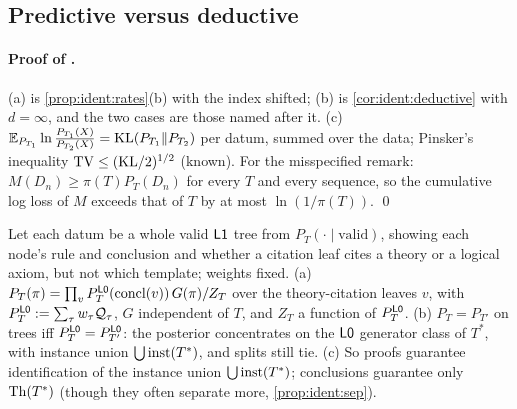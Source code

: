 \subsection{Predictive versus deductive}\label{app:ident:pred}

\paragraph{Proof of .} (a) is \cref{prop:ident:rates}(b) with the index shifted; (b) is \cref{cor:ident:deductive} with $d=\infty$, and the two cases are those named after it. (c) $\mathbb{E}_{P_{T_1}}\ln\frac{P_{T_1}(X)}{P_{T_2}(X)}=\mathrm{KL}(P_{T_1}\|P_{T_2})$ per datum, summed over the data; Pinsker's inequality $\mathrm{TV}\le(\mathrm{KL}/2)^{1/2}$ (known). For the misspecified remark: $M(D_n)\ge\pi(T)P_T(D_n)$ for every $T$ and every sequence, so the cumulative log loss of $M$ exceeds that of $T$ by at most $\ln(1/\pi(T))$. \qed

\begin{proposition}\label{prop:ident:proofs}
Let each datum be a whole valid $\mathord{\mathsf{L1}}$ tree from $P_T(\cdot\mid\text{valid})$, showing each node's rule and conclusion and whether a citation leaf cites a theory or a logical axiom, but not which template; weights fixed. (a) $P_T(\pi)=\prod_vP^{\mathord{\mathsf{L0}}}_T(\mathrm{concl}(v))\,G(\pi)/Z_T$ over the theory-citation leaves $v$, with $P^{\mathord{\mathsf{L0}}}_T:=\sum_\tau w_\tau\mathcal{Q}_\tau$, $G$ independent of $T$, and $Z_T$ a function of $P^{\mathord{\mathsf{L0}}}_T$. (b) $P_T=P_{T'}$ on trees iff $P^{\mathord{\mathsf{L0}}}_T=P^{\mathord{\mathsf{L0}}}_{T'}$: the posterior concentrates on the $\mathord{\mathsf{L0}}$ generator class of $T^*$, with instance union $\bigcup\mathrm{inst}(T^*)$, and splits still tie. (c) So proofs guarantee identification of the instance union $\bigcup\mathrm{inst}(T^*)$; conclusions guarantee only $\mathrm{Th}(T^*)$ (though they often separate more, \cref{prop:ident:sep}).
\end{proposition}

